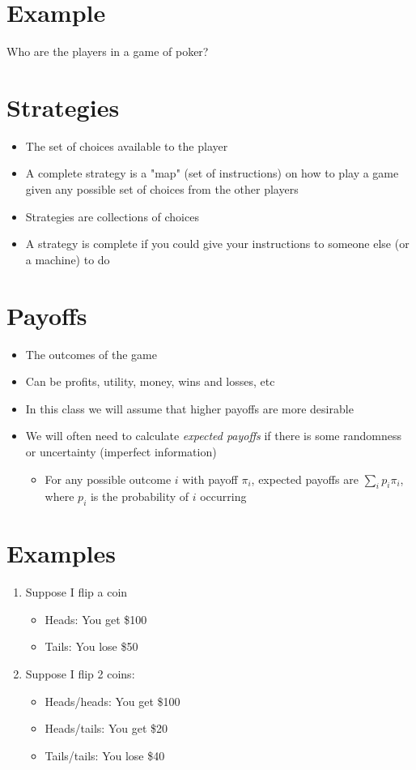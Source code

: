 \documentclass[11pt]{article}
\begin{document}
\section*{Example}
\label{sec:orgad3a63f}
Who are the players in a game of poker?

\section*{Strategies}
\label{sec:org0303fd0}
\begin{itemize}
\item The set of choices available to the player
\item A complete strategy is a "map" (set of instructions) on how to play a game given any possible set of choices from the other players
\item Strategies are collections of choices
\item A strategy is complete if you could give your instructions to someone else (or a machine) to do
\end{itemize}

\section*{Payoffs}
\label{sec:org11d92a6}
\begin{itemize}
\item The outcomes of the game
\item Can be profits, utility, money, wins and losses, etc
\item In this class we will assume that higher payoffs are more desirable
\item We will often need to calculate \emph{expected payoffs} if there is some randomness or uncertainty (imperfect information)
\begin{itemize}
\item For any possible outcome \(i\) with payoff \(\pi_i\), expected payoffs are \(\sum_i p_i \pi_i\), where \(p_i\) is the probability of \(i\) occurring
\end{itemize}
\end{itemize}
\section*{Examples}
\label{sec:org1ac127d}
\begin{enumerate}
\item Suppose I flip a coin
\begin{itemize}
\item Heads: You get \$100
\item Tails: You lose \$50
\end{itemize}
\item Suppose I flip 2 coins:
\begin{itemize}
\item Heads/heads: You get \$100
\item Heads/tails: You get \$20
\item Tails/tails: You lose \$40
\end{itemize}
\end{enumerate}
\end{document}
